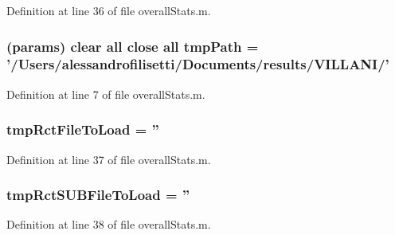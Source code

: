 Definition at line 36 of file overall\-Stats.\-m.

\hypertarget{a00032_a1e5a4863ab2b87f923e1d19e2da1f5ac}{
\subsubsection[{tmp\-Path}]{(params) clear all close all tmp\-Path = '/Users/alessandrofilisetti/Documents/results/V\-I\-L\-L\-A\-N\-I/'}}\label{a00032_a1e5a4863ab2b87f923e1d19e2da1f5ac}


Definition at line 7 of file overall\-Stats.\-m.

\hypertarget{a00032_a729812cd35dceb80bddf2bea4d57c3d5}{
\subsubsection[{tmp\-Rct\-File\-To\-Load}]{ tmp\-Rct\-File\-To\-Load = ''}}\label{a00032_a729812cd35dceb80bddf2bea4d57c3d5}


Definition at line 37 of file overall\-Stats.\-m.

\hypertarget{a00032_aa7c848ee61f4363047d50b027f539e68}{
\subsubsection[{tmp\-Rct\-S\-U\-B\-File\-To\-Load}]{ tmp\-Rct\-S\-U\-B\-File\-To\-Load = ''}}\label{a00032_aa7c848ee61f4363047d50b027f539e68}


Definition at line 38 of file overall\-Stats.\-m.


